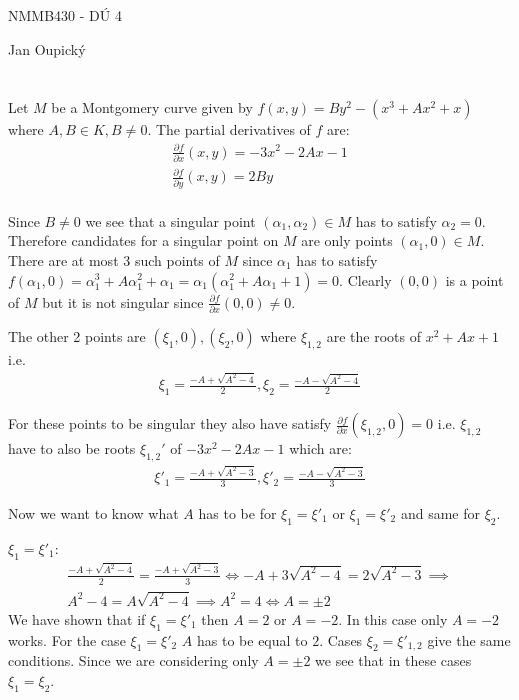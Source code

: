 \documentclass[12pt, a4paper]{article}
\begin{document}
\begin{center}
\large NMMB430 - DÚ 4

\normalsize Jan Oupický
\end{center}
\vspace{1\baselineskip}

\section{}
Let $M$ be a Montgomery curve given by $f(x,y) = By^2 - (x^3+Ax^2+x)$ where $A,B \in K, B \neq 0$. The partial derivatives of $f$ are:
\begin{gather*}
\frac{\partial f}{\partial x} (x,y) = -3x^2-2Ax-1\\
\frac{\partial f}{\partial y} (x,y) = 2By\\
\end{gather*}

Since $B \neq 0$ we see that a singular point $(\alpha_1, \alpha_2) \in M$ has to satisfy $\alpha_2 = 0$. Therefore candidates for a singular point on $M$ are only points $(\alpha_1, 0) \in M$. There are at most $3$ such points of $M$ since $\alpha_1$ has to satisfy $f(\alpha_1, 0) = \alpha_1^3+A\alpha_1^2+\alpha_1 = \alpha_1(\alpha_1^2+A\alpha_1 + 1) = 0$. Clearly $(0,0)$ is a point of $M$ but it is not singular since $\frac{\partial f}{\partial x} (0,0)\neq 0$.

The other 2 points are $(\xi_1, 0), (\xi_2, 0)$ where $\xi_{1,2}$ are the roots of $x^2+Ax+1$ i.e.
\begin{gather*}
\xi_1 = \frac{-A+\sqrt{A^2-4}}{2}, \xi_2 = \frac{-A-\sqrt{A^2-4}}{2}
\end{gather*}

For these points to be singular they also have satisfy $\frac{\partial f}{\partial x}(\xi_{1,2}, 0) = 0$ i.e. $\xi_{1,2}$ have to also be roots $\xi_{1,2}'$ of $-3x^2-2Ax-1$ which are:
\begin{gather*}
\xi'_1 = \frac{-A+\sqrt{A^2-3}}{3}, \xi'_2 = \frac{-A-\sqrt{A^2-3}}{3}
\end{gather*}

Now we want to know what $A$ has to be for $\xi_1 = \xi'_1$ or $\xi_1 = \xi'_2$ and same for $\xi_2$.

$\xi_1 = \xi'_1$:
\begin{gather*}
\frac{-A+\sqrt{A^2-4}}{2} = \frac{-A+\sqrt{A^2-3}}{3} \iff -A+3\sqrt{A^2-4} = 2\sqrt{A^2-3} \implies\\
A^2-4 = A\sqrt{A^2-4} \implies A^2=4 \iff A = \pm 2
\end{gather*}
We have shown that if $\xi_1 = \xi'_1$ then $A = 2$ or $A = -2$. In this case only $A = -2$ works. For the case $\xi_1 = \xi'_2$ $A$ has to be equal to $2$. Cases $\xi_2 = \xi'_{1,2}$ give the same conditions. Since we are considering only $A= \pm2$ we see that in these cases $\xi_1 = \xi_2$.
\end{document}
